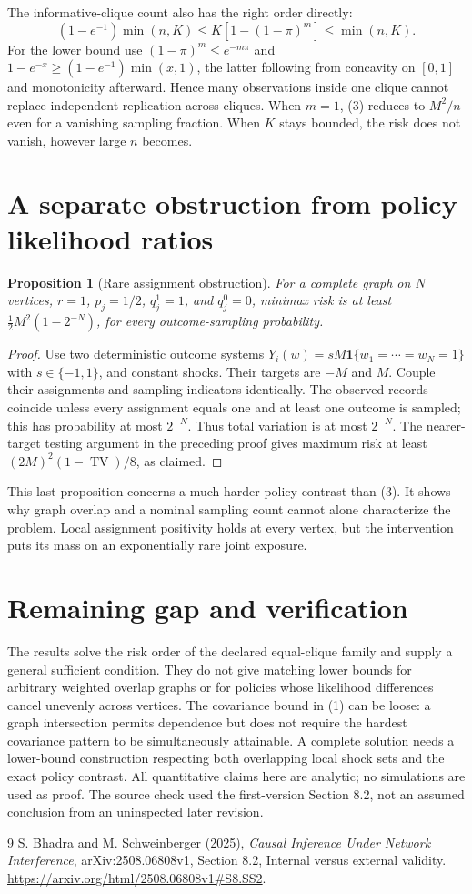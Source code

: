 \documentclass[11pt]{article}
\newtheorem{proposition}[theorem]{Proposition}
\theoremstyle{remark}
\newcommand{\Ind}{\mathbf 1}
\newcommand{\TV}{\operatorname{TV}}
\begin{document}
The informative-clique count also has the right order directly:
\[
 (1-e^{-1})\min(n,K)\leq K[1-(1-\pi)^m]\leq\min(n,K).
\]
For the lower bound use $(1-\pi)^m\leq e^{-m\pi}$ and
$1-e^{-x}\geq(1-e^{-1})\min(x,1)$, the latter following from concavity
on $[0,1]$ and monotonicity afterward. Hence many observations inside
one clique cannot replace independent replication across cliques.
When $m=1$, (3) reduces to $M^2/n$ even for a vanishing sampling fraction.
When $K$ stays bounded, the risk does not vanish, however large $n$ becomes.

\section{A separate obstruction from policy likelihood ratios}
\begin{proposition}[Rare assignment obstruction]
For a complete graph on $N$ vertices, $r=1$, $p_j=1/2$,
$q^1_j=1$, and $q^0_j=0$, minimax risk is at least
$\tfrac12M^2(1-2^{-N})$, for every outcome-sampling probability.
\end{proposition}
\begin{proof}
Use two deterministic outcome systems
$Y_i(w)=sM\Ind\{w_1=\cdots=w_N=1\}$ with $s\in\{-1,1\}$,
and constant shocks. Their targets are $-M$ and $M$. Couple their
assignments and sampling indicators identically. The observed records
coincide unless every assignment equals one and at least one outcome is
sampled; this has probability at most $2^{-N}$. Thus total variation is
at most $2^{-N}$. The nearer-target testing argument in the preceding
proof gives maximum risk at least $(2M)^2(1-\TV)/8$, as claimed.
\end{proof}

This last proposition concerns a much harder policy contrast than (3).
It shows why graph overlap and a nominal sampling count cannot alone
characterize the problem. Local assignment positivity holds at every
vertex, but the intervention puts its mass on an exponentially rare
joint exposure.

\section{Remaining gap and verification}
The results solve the risk order of the declared equal-clique family and
supply a general sufficient condition. They do not give matching lower
bounds for arbitrary weighted overlap graphs or for policies whose
likelihood differences cancel unevenly across vertices. The covariance
bound in (1) can be loose: a graph intersection permits dependence but
does not require the hardest covariance pattern to be simultaneously
attainable. A complete solution needs a lower-bound construction respecting
both overlapping local shock sets and the exact policy contrast.
All quantitative claims here are analytic; no simulations are used as
proof. The source check used the first-version Section 8.2, not an assumed
conclusion from an uninspected later revision.

\begin{thebibliography}{9}
 S. Bhadra and M. Schweinberger (2025),
\emph{Causal Inference Under Network Interference}, arXiv:2508.06808v1,
Section 8.2, Internal versus external validity.
\url{https://arxiv.org/html/2508.06808v1#S8.SS2}.
\end{thebibliography}
\end{document}
